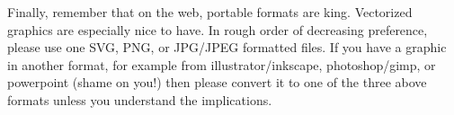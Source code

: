 \documentclass[paper=a4, fontsize=11pt]{scrartcl}
\numberwithin{equation}{section}        %
\numberwithin{figure}{section}            %
\numberwithin{table}{section}                %
\begin{document}
Finally, remember that on the web, portable formats are king. Vectorized graphics are
especially nice to have. In rough order of decreasing preference, please use one
SVG, PNG, or JPG/JPEG formatted files. If you have a graphic in another format,
for example from illustrator/inkscape, photoshop/gimp, or powerpoint (shame on
you!) then please convert it to one of the three above formats unless you
understand the implications.


\end{document}
